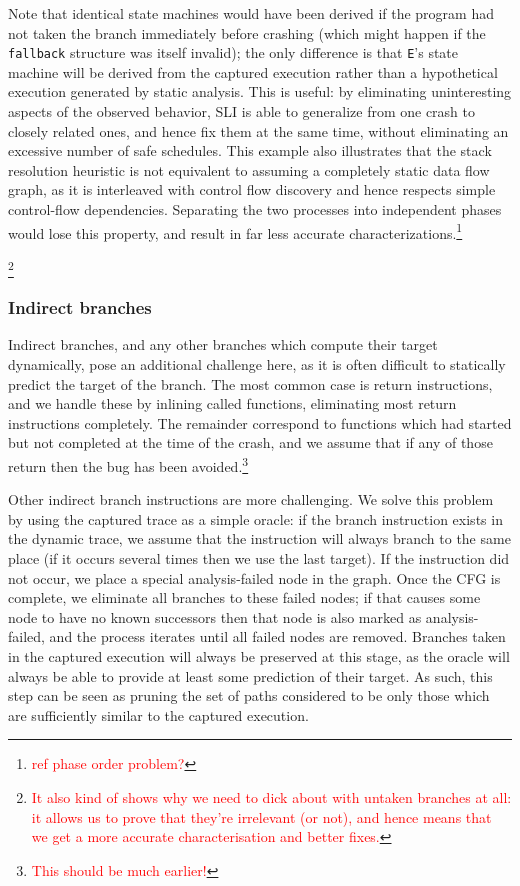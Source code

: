 \documentclass[10pt,twocolumn,preprint,natbib,authoryear]{sigplanconf}
\newcommand{\editorial}[1]{\textcolor{red}{\footnote{\textcolor{red}{#1}}}}
\begin{document}
Note that identical state machines would have been derived if the
program had not taken the branch immediately before crashing (which
might happen if the \verb|fallback| structure was itself invalid); the
only difference is that \verb|E|'s state machine will be derived from
the captured execution rather than a hypothetical execution generated
by static analysis.  This is useful: by eliminating uninteresting
aspects of the observed behavior, SLI is able to generalize from one
crash to closely related ones, and hence fix them at the same time,
without eliminating an excessive number of safe schedules.  This
example also illustrates that the stack resolution heuristic is not
equivalent to assuming a completely static data flow graph, as it is
interleaved with control flow discovery and hence respects simple
control-flow dependencies.  Separating the two processes into
independent phases would lose this property, and result in far less
accurate characterizations.\editorial{ref phase order problem?}

\editorial{It also kind of shows why we need to dick about with
  untaken branches at all: it allows us to prove that they're
  irrelevant (or not), and hence means that we get a more accurate
  characterisation and better fixes.}

\subsubsection{Indirect branches}
Indirect branches, and any other branches which compute their target
dynamically, pose an additional challenge here, as it is often
difficult to statically predict the target of the branch.  The most
common case is return instructions, and we handle these by inlining
called functions, eliminating most return instructions completely.
The remainder correspond to functions which had started but not
completed at the time of the crash, and we assume that if any of those
return then the bug has been avoided.\editorial{This should be much
  earlier!}

Other indirect branch instructions are more challenging.  We solve
this problem by using the captured trace as a simple oracle: if the
branch instruction exists in the dynamic trace, we assume that the
instruction will always branch to the same place (if it occurs several
times then we use the last target).  If the instruction did not occur,
we place a special analysis-failed node in the graph.  Once the CFG is
complete, we eliminate all branches to these failed nodes; if that
causes some node to have no known successors then that node is also
marked as analysis-failed, and the process iterates until all failed
nodes are removed.  Branches taken in the captured execution will
always be preserved at this stage, as the oracle will always be able
to provide at least some prediction of their target.  As such, this
step can be seen as pruning the set of paths considered to be only
those which are sufficiently similar to the captured execution.
\end{document}
